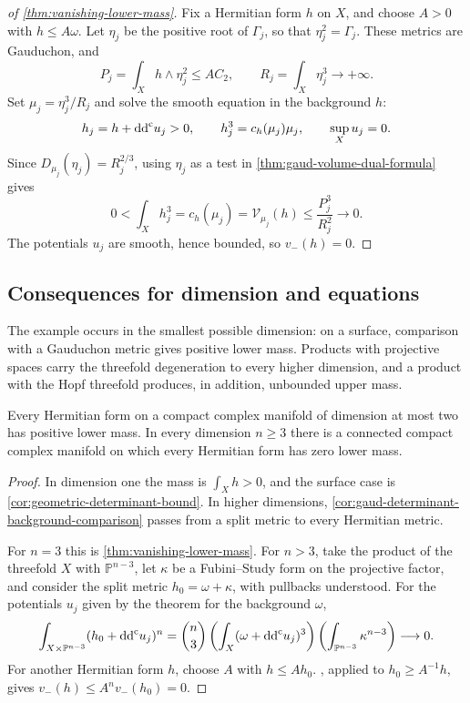 \begin{proof}[of \cref{thm:vanishing-lower-mass}]
Fix a Hermitian form $h$ on $X$, and choose $A>0$ with $h\leq A\omega$. Let $\eta_j$ be the positive root of $\Gamma_j$, so that $\eta_j^2=\Gamma_j$. These metrics are Gauduchon, and
\[
 P_j=\int_Xh\wedge\eta_j^2\leq AC_2,\qquad
 R_j=\int_X\eta_j^3\longrightarrow+\infty.
\]
Set $\mu_j=\eta_j^3/R_j$ and solve the smooth equation in the background $h$:
\[
 h_j=h+\mathrm{dd}^{\mathrm{c}} u_j>0,\qquad h_j^3=c_h(\mu_j)\mu_j,
 \qquad \sup_Xu_j=0.
\]
Since $D_{\mu_j}(\eta_j)=R_j^{2/3}$, using $\eta_j$ as a test in \cref{thm:gaud-volume-dual-formula} gives
\[
 0<\int_Xh_j^3=c_h(\mu_j)=\mathcal V_{\mu_j}(h)
       \leq\frac{P_j^3}{R_j^2}\longrightarrow0.
\]
The potentials $u_j$ are smooth, hence bounded, so $v_-(h)=0$.
\end{proof}

\subsection{Consequences for dimension and equations}

The example occurs in the smallest possible dimension: on a surface, comparison with a Gauduchon metric gives positive lower mass. Products with projective spaces carry the threefold degeneration to every higher dimension, and a product with the Hopf threefold produces, in addition, unbounded upper mass.

\begin{corollary}\label{cor:lower-mass-dimension}
Every Hermitian form on a compact complex manifold of dimension at most two has positive lower mass. In every dimension $n\geq3$ there is a connected compact complex manifold on which every Hermitian form has zero lower mass.
\end{corollary}
\begin{proof}
In dimension one the mass is $\int_Xh>0$, and the surface case is \cref{cor:geometric-determinant-bound}. In higher dimensions, \cref{cor:gaud-determinant-background-comparison} passes from a split metric to every Hermitian metric.

For $n=3$ this is \cref{thm:vanishing-lower-mass}. For $n>3$, take the product of the threefold $X$ with $\mathbb P^{n-3}$, let $\kappa$ be a Fubini--Study form on the projective factor, and consider the split metric $h_0=\omega+\kappa$, with pullbacks understood. For the potentials $u_j$ given by the theorem for the background $\omega$,
\[
 \int_{X\times\mathbb P^{n-3}}(h_0+\mathrm{dd}^{\mathrm{c}} u_j)^n
 =\binom n3\left(\int_X(\omega+\mathrm{dd}^{\mathrm{c}} u_j)^3\right)
                   \left(\int_{\mathbb P^{n-3}}\kappa^{n-3}\right)
 \longrightarrow0.
\]
For another Hermitian form $h$, choose $A$ with $h\leq Ah_0$. , applied to $h_0\geq A^{-1}h$, gives $v_-(h)\leq A^n v_-(h_0)=0$.
\end{proof}

